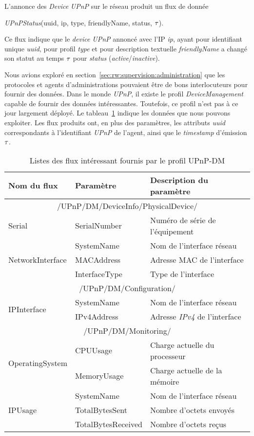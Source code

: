 L'annonce des \textit{Device} \textit{UPnP} sur le réseau produit un flux de donnée \begin{center}\textit{UPnPStatus}(uuid, ip, type, friendlyName, status, $\tau$).\end{center} Ce flux indique que le \textit{device UPnP} annoncé avec l'IP \textit{ip}, ayant pour identifiant unique \textit{uuid}, pour profil \textit{type} et pour description textuelle \textit{friendlyName} a changé son statut au temps $\tau$ pour \textit{status} (\textit{active}/\textit{inactive}).

Nous avions exploré en section~\ref{sec:rw:supervision:administration} que les protocoles et agents d'administrations pouvaient être de bons interlocuteurs pour fournir des données. Dans le monde \textit{UPnP}, il existe le profil \textit{DeviceManagement} capable de fournir des données intéressantes. Toutefois, ce profil n'est pas à ce jour largement déployé. Le tableau~\ref{tab:valid:domvision:upnpdm} indique les données que nous pouvons exploiter. Les flux produits ont, en plus des paramètres, les attributs \textit{uuid} correspondants à l'identifiant \textit{UPnP} de l'agent, ainsi que le \textit{timestamp} d'émission $\tau$.

\begin{table}[ht]
\centering
\begin{tabular}{|m{}|>{\ttfamily}m{}|m{}|} \bottomrule
\rowcolor{hypcolor} Nom du flux & \rm Paramètre & Description du paramètre\\ \hline
\multicolumn{3}{|c|}{/UPnP/DM/DeviceInfo/PhysicalDevice/} \\\hline
Serial & {SerialNumber} & Numéro de série de l'équipement\\\hline
\multirow{3}{*}{NetworkInterface} & {SystemName} & Nom de l'interface réseau\\\cline{2-3}
& {MACAddress} & Adresse MAC de l'interface\\\cline{2-3}
& InterfaceType & Type de l'interface \\\hline
\multicolumn{3}{|c|}{/UPnP/DM/Configuration/} \\\hline
\multirow{2}{*}{IPInterface} & SystemName & Nom de l'interface réseau \\\cline{2-3}
& IPv4Address & Adresse \textit{IPv4} de l'interface \\ \hline
\multicolumn{3}{|c|}{/UPnP/DM/Monitoring/} \\\hline
\multirow{2}{*}{OperatingSystem} & CPUUsage & Charge actuelle du processeur\\\cline{2-3}
& MemoryUsage & Charge actuelle de la mémoire\\ \hline
\multirow{3}{*}{IPUsage} & SystemName & Nom de l'interface réseau\\ \cline{2-3}
& TotalBytesSent & Nombre d'octets envoyés \\\cline{2-3}
& TotalBytesReceived & Nombre d'octets reçus \\ \toprule
\end{tabular}
\caption{Listes des flux intéressant fournis par le profil UPnP-DM}\label{tab:valid:domvision:upnpdm}
\end{table}

